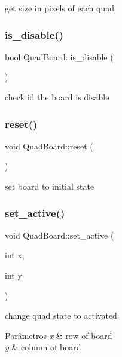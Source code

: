 get size in pixels of each quad 

\mbox{\label{classQuadBoard_a3017a3c075ef268c369b27c3a0175479}} 
\subsubsection{\texorpdfstring{is\+\_\+disable()}{is\_disable()}}
{\footnotesize\ttfamily bool Quad\+Board\+::is\+\_\+disable (\begin{DoxyParamCaption}{ }\end{DoxyParamCaption})\hspace{0.3cm}{\ttfamily [inline]}}



check id the board is disable 

\mbox{\label{classQuadBoard_a06118c0b36ac779243109674e2b067f7}} 
\subsubsection{\texorpdfstring{reset()}{reset()}}
{\footnotesize\ttfamily void Quad\+Board\+::reset (\begin{DoxyParamCaption}{ }\end{DoxyParamCaption})}



set board to initial state 

\mbox{\label{classQuadBoard_a47799adc84ee9172ce58e6aff826896e}} 
\subsubsection{\texorpdfstring{set\+\_\+active()}{set\_active()}}
{\footnotesize\ttfamily void Quad\+Board\+::set\+\_\+active (\begin{DoxyParamCaption}\item[{int}]{x,  }\item[{int}]{y }\end{DoxyParamCaption})}

change quad state to activated 
\begin{DoxyParams}{Parâmetros}
{\em x} & row of board \\
\hline
{\em y} & column of board \\
\hline
\end{DoxyParams}
\mbox{\label{classQuadBoard_a717f22cb86159b20b9cbfcf83b230d51}} 
